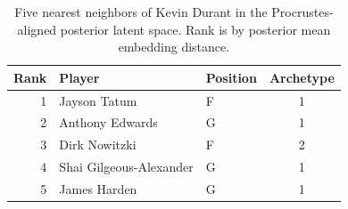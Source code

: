 \begin{table}[htbp]
  \centering\small
  \begin{tabular}{rllc}
    \toprule
    Rank & Player & Position & Archetype \\
    \midrule
    1 & Jayson Tatum & F & 1 \\
    2 & Anthony Edwards & G & 1 \\
    3 & Dirk Nowitzki & F & 2 \\
    4 & Shai Gilgeous-Alexander & G & 1 \\
    5 & James Harden & G & 1 \\
    \bottomrule
  \end{tabular}
  \caption{Five nearest neighbors of Kevin Durant in the Procrustes-aligned posterior latent space. Rank is by posterior mean embedding distance.}
  \label{tab:Kevin_Durant_neighbors}
\end{table}

